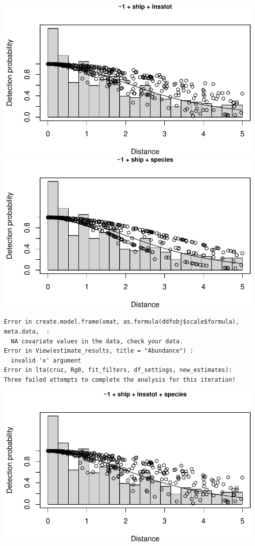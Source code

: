 \documentclass[
]{book}
\begin{document}
\includegraphics{figures/unnamed-chunk-177-27.pdf} \includegraphics{figures/unnamed-chunk-177-28.pdf}

\begin{verbatim}
Error in create.model.frame(xmat, as.formula(ddfobj$scale$formula), meta.data,  : 
  NA covariate values in the data, check your data.
Error in View(estimate_results, title = "Abundance") : 
  invalid 'x' argument
Error in lta(cruz, Rg0, fit_filters, df_settings, new_estimates): Three failed attempts to complete the analysis for this iteration!
\end{verbatim}

\includegraphics{figures/unnamed-chunk-177-29.pdf}
\end{document}
